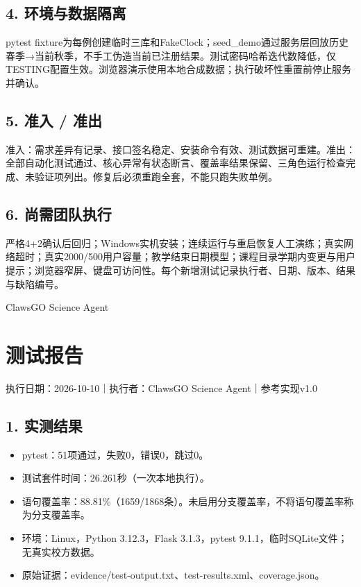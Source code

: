 \documentclass[UTF8,11pt,a4paper]{ctexart}
\providecommand{\tightlist}{\setlength{\itemsep}{0pt}\setlength{\parskip}{0pt}}
\begin{document}
\hypertarget{4-ux73afux5883ux4e0eux6570ux636eux9694ux79bb}{%
\subsection{4.
环境与数据隔离}\label{4-ux73afux5883ux4e0eux6570ux636eux9694ux79bb}}

pytest
fixture为每例创建临时三库和FakeClock；seed\_\allowbreak{}demo通过服务层回放历史春季→当前秋季，不手工伪造当前已注册结果。测试密码哈希迭代数降低，仅TESTING配置生效。浏览器演示使用本地合成数据；执行破坏性重置前停止服务并确认。

\hypertarget{5-ux51c6ux5165--ux51c6ux51fa}{%
\subsection{5. 准入 / 准出}\label{5-ux51c6ux5165--ux51c6ux51fa}}

准入：需求差异有记录、接口签名稳定、安装命令有效、测试数据可重建。准出：全部自动化测试通过、核心异常有状态断言、覆盖率结果保留、三角色运行检查完成、未验证项列出。修复后必须重跑全套，不能只跑失败单例。

\hypertarget{6-ux5c1aux9700ux56e2ux961fux6267ux884c}{%
\subsection{6.
尚需团队执行}\label{6-ux5c1aux9700ux56e2ux961fux6267ux884c}}

严格4+2确认后回归；Windows实机安装；连续运行与重启恢复人工演练；真实网络超时；真实2000/500用户容量；教学结束日期模型；课程目录学期内变更与用户提示；浏览器窄屏、键盘可访问性。每个新增测试记录执行者、日期、版本、结果与缺陷编号。

ClawsGO Science Agent

\clearpage
\hypertarget{ux6d4bux8bd5ux62a5ux544a}{%
\section{测试报告}\label{ux6d4bux8bd5ux62a5ux544a}}

执行日期：2026-10-10｜执行者：ClawsGO Science Agent｜参考实现v1.0

\hypertarget{1-ux5b9eux6d4bux7ed3ux679c}{%
\subsection{1. 实测结果}\label{1-ux5b9eux6d4bux7ed3ux679c}}

\begin{itemize}
\tightlist
\item
  pytest：51项通过，失败0，错误0，跳过0。
\item
  测试套件时间：26.261秒（一次本地执行）。
\item
  语句覆盖率：88.81\%（1659/1868条）。未启用分支覆盖率，不将语句覆盖率称为分支覆盖率。
\item
  环境：Linux，Python 3.12.3，Flask 3.1.3，pytest
  9.1.1，临时SQLite文件；无真实校方数据。
\item
  原始证据：evidence/test-output.txt、test-results.xml、coverage.json。
\end{itemize}
\end{document}
